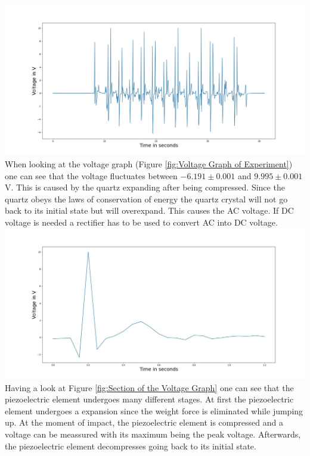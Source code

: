 \includegraphics[width=\textwidth]{Figure_11.jpeg}
\label{fig:Voltage Graph of Experiment}
\vspace{0.5cm}
When looking at the voltage graph (Figure \ref{fig:Voltage Graph of Experiment}) one can see that the voltage fluctuates between $-6.191 \pm 0.001$ and $9.995 \pm 0.001$ V. This is caused by the quartz expanding after being compressed. Since the quartz obeys the laws of conservation of energy the quartz crystal will not go back to its initial state but will overexpand. This causes the AC voltage. If DC voltage is needed a rectifier has to be used to convert AC into DC voltage.
\includegraphics[width=\textwidth]{Figure_12.jpeg}
\label{fig:Section of the Voltage Graph}
\vspace{0.5cm}
Having a look at Figure \ref{fig:Section of the Voltage Graph} one can see that the piezoelectric element undergoes many different stages. At first the piezoelectric element undergoes a expansion since the weight force is eliminated while jumping up. At the moment of impact, the piezoelectric element is compressed and a voltage can be meassured with its maximum being the peak voltage. Afterwards, the piezoelectric element decompresses going back to its initial state.